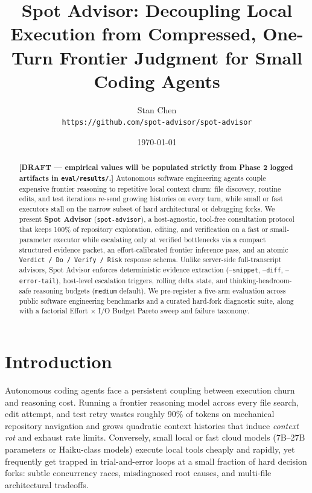 \documentclass[11pt]{article}
\title{\textbf{Spot Advisor: Decoupling Local Execution from Compressed, One-Turn Frontier Judgment for Small Coding Agents}}
\author{
    Stan Chen \\
    \texttt{https://github.com/spot-advisor/spot-advisor}
}
\date{\today}
\begin{document}
\maketitle

\begin{abstract}
\textbf{[DRAFT --- empirical values will be populated strictly from Phase 2 logged artifacts in \texttt{eval/results/}.]}
Autonomous software engineering agents couple expensive frontier reasoning to repetitive local context churn: file discovery, routine edits, and test iterations re-send growing histories on every turn, while small or fast executors stall on the narrow subset of hard architectural or debugging forks. We present \textbf{Spot Advisor} (\texttt{spot-advisor}), a host-agnostic, tool-free consultation protocol that keeps 100\% of repository exploration, editing, and verification on a fast or small-parameter executor while escalating only at verified bottlenecks via a compact structured evidence packet, an effort-calibrated frontier inference pass, and an atomic \texttt{Verdict / Do / Verify / Risk} response schema. Unlike server-side full-transcript advisors, Spot Advisor enforces deterministic evidence extraction (\texttt{--snippet}, \texttt{--diff}, \texttt{--error-tail}), host-level escalation triggers, rolling delta state, and thinking-headroom-safe reasoning budgets (\texttt{medium} default). We pre-register a five-arm evaluation across public software engineering benchmarks and a curated hard-fork diagnostic suite, along with a factorial Effort $\times$ I/O Budget Pareto sweep and failure taxonomy.
\end{abstract}

\section{Introduction}
\label{sec:intro}

Autonomous coding agents face a persistent coupling between execution churn and reasoning cost. Running a frontier reasoning model across every file search, edit attempt, and test retry wastes roughly 90\% of tokens on mechanical repository navigation and grows quadratic context histories that induce \emph{context rot} and exhaust rate limits. Conversely, small local or fast cloud models ($7\text{B}\text{--}27\text{B}$ parameters or Haiku-class models) execute local tools cheaply and rapidly, yet frequently get trapped in trial-and-error loops at a small fraction of hard decision forks: subtle concurrency races, misdiagnosed root causes, and multi-file architectural tradeoffs.
\end{document}
